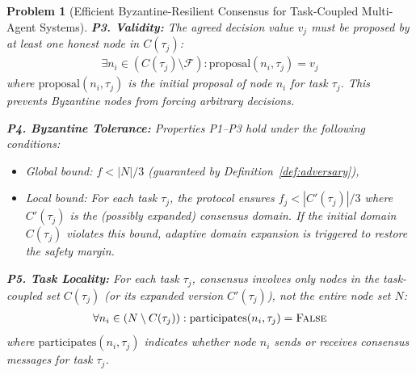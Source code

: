 \documentclass[lettersize,journal]{IEEEtran}
\newtheorem{problem}{Problem}
\begin{document}
\begin{problem}[Efficient Byzantine-Resilient Consensus for Task-Coupled Multi-Agent Systems]
\vspace{0.3cm}
\noindent \textbf{P3. Validity:} The agreed decision value $v_j$ must be 
proposed by at least one honest node in $C(\tau_j)$:
\begin{equation}
\begin{aligned}
\exists n_i \in (C(\tau_j) \setminus \mathcal{F}): 
\text{proposal}(n_i, \tau_j) = v_j
\label{eq:validity}
\end{aligned}
\end{equation}
where $\text{proposal}(n_i, \tau_j)$ is the initial proposal of node $n_i$ 
for task $\tau_j$. This prevents Byzantine nodes from forcing arbitrary 
decisions.

\vspace{0.3cm}
\noindent \textbf{P4. Byzantine Tolerance:} Properties P1--P3 hold under 
the following conditions:
\begin{itemize}
	\item \textit{Global bound}: $f < |N|/3$ (guaranteed by 
		  Definition~\ref{def:adversary}),
    \item \textit{Local bound}: For each task $\tau_j$, the protocol 
          ensures $f_j < |C'(\tau_j)|/3$ where $C'(\tau_j)$ is the 
          (possibly expanded) consensus domain. If the initial domain 
          $C(\tau_j)$ violates this bound, adaptive domain expansion is triggered to restore the safety margin.
\end{itemize}

\vspace{0.3cm}
\noindent \textbf{P5. Task Locality:} For each task $\tau_j$, consensus 
involves only nodes in the task-coupled set $C(\tau_j)$ (or its expanded 
version $C'(\tau_j)$), not the entire node set $N$:
\begin{equation}
\begin{aligned}
\forall n_i \in (N \setminus C(\tau_j)): 
\text{participates}(n_i, \tau_j) = \textsc{False}
\label{eq:locality}
\end{aligned}
\end{equation}
where $\text{participates}(n_i, \tau_j)$ indicates whether node $n_i$ 
sends or receives consensus messages for task $\tau_j$.


\end{problem}
\end{document}
